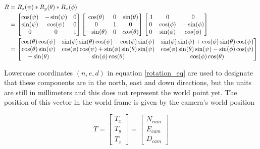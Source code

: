   \begin{align}
  \label{rotation_equation}
  R &= R_z(\psi)*R_y(\theta)*R_x(\phi) \\ \notag
    &= \begin{bmatrix} \cos(\psi)  & -\sin(\psi) & 0 \\ 
                        \sin(\psi) & \cos(\psi) & 0 \\
                         0         &   0         & 1  \end{bmatrix} 
       \begin{bmatrix} \cos(\theta) & 0 & \sin(\theta) \\ 
                             0      & 1 &       0        \\
                      -\sin(\theta) & 0 & cos(\theta) \end{bmatrix}
       \begin{bmatrix} \ 1 &    0       & 0           \\ 
                         0 & \cos(\phi) & -\sin(\phi) \\
                         0 & \sin(\phi) & cos(\phi)  \end{bmatrix} \\ \notag
    &= \begin{bmatrix} \cos(\theta)\cos(\psi) & \sin(\phi)\sin(\theta)\cos(\psi) - \cos(\phi)\sin(\psi) &  \sin(\phi)\sin(\psi) +  \cos(\phi)\sin(\theta)\cos(\psi) \\
    \cos(\theta)\sin(\psi) & \cos(\phi)\cos(\psi) + \sin(\phi)\sin(\theta)\sin(\psi) &  \cos(\phi)\sin(\theta)\sin(\psi) - \sin(\phi)\cos(\psi) \\
     -\sin(\theta) & \sin(\phi)\cos(\theta) & \cos(\phi)\cos(\theta)     \end{bmatrix}
  \end{align}
  
 Lowercase coordinates $(n,e,d)$ in equation \ref{rotation_eq} are used to designate that these components are in the north, east and down directions, but the units are still in millimeters and this does not represent the world point yet.  The position of this vector in the world frame is given by the camera's world position

 \begin{equation}
 \label{translation_equation}
 T = 
 \begin{bmatrix} T_x \\ T_y \\ T_z \end{bmatrix} =
 \begin{bmatrix} N_{cam} \\ E_{cam} \\ D_{cam} \end{bmatrix}
 \end{equation}

